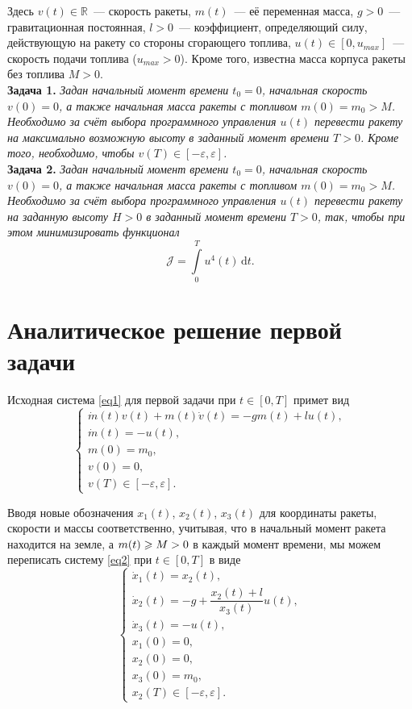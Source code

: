 \documentclass[a4paper,12pt]{article}
\newcommand{\hm}[1]{#1\nobreak\discretionary{}{\hbox{\ensuremath{#1}}}{}}
\begin{document}
Здесь $v(t) \in \mathbb{R}$~--- скорость ракеты, $m(t)$~--- её переменная масса, $g > 0$~--- гравитационная постоянная, $l > 0$~--- коэффициент, определяющий силу, действующую на ракету со стороны сгорающего топлива, $u(t) \in [0, u_{max}]$~--- скорость подачи топлива ($u_{max} > 0$). Кроме того, известна масса корпуса ракеты без топлива $M > 0$. \\

\textbf{Задача 1.} \textit{Задан начальный момент времени $t_0 = 0$, начальная скорость $v(0) = 0$, а также начальная масса ракеты с топливом $m(0) = m_0 > M$. Необходимо за счёт выбора программного управления $u(t)$ перевести ракету на максимально возможную высоту в заданный момент времени $T > 0$. Кроме того, необходимо, чтобы $v(T) \in [-\varepsilon, \varepsilon]$.}\\

\textbf{Задача 2.} \textit{Задан начальный момент времени $t_0 = 0$, начальная скорость $v(0) = 0$, а также начальная масса ракеты с топливом $m(0) = m_0 > M$. Необходимо за счёт выбора программного управления $u(t)$ перевести ракету на заданную высоту $H > 0$ в заданный момент времени $T > 0$, так, чтобы при этом минимизировать функционал 
\[ \mathcal{J} = \int\limits_{0}^{T}{u^4(t)} \, \mathrm{d}t.\]}
\newpage

\section{Аналитическое решение первой задачи}
Исходная система \eqref{eq1} для первой задачи при $t \in [0, T]$ примет вид
\hypertarget{p2}{}
\begin{equation} \label{eq2}
	\begin{cases} 
		\dot{m}(t) v(t) + m(t)\dot{v}(t) = -gm(t) + lu(t), \\
		\dot{m}(t) = -u(t), \\
		m(0) = m_0, \\
		v(0) = 0, \\
		v(T) \in [-\varepsilon, \varepsilon].
		\end{cases}
\end{equation}

Вводя новые обозначения $x_1(t)$, $x_2(t)$, $x_3(t)$ для координаты ракеты, скорости и массы соответственно, учитывая, что в начальный момент ракета находится на земле, а $m(t) \hm \geqslant M > 0$ в каждый момент времени, мы можем переписать систему \eqref{eq2} при $t \in [0, T]$ в виде 
\hypertarget{p3}{}
\begin{equation} \label{eq3}
	\begin{cases} 
		\dot{x}_1(t) = x_2(t), \\
		\dot{x}_2(t) = -g + \dfrac{x_2(t) + l}{x_3(t)}u(t), \\
		\dot{x}_3(t) = -u(t), \\
		x_1(0) = 0, \\
		x_2(0) = 0, \\
		x_3(0) = m_0, \\
		x_2(T) \in [-\varepsilon, \varepsilon]. 
	\end{cases}
\end{equation}
\end{document}
